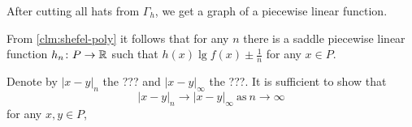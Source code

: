\begin{clm}{}\label{clm:shefel-poly}
After cutting all hats from $\Gamma_h$,
we get a graph of a piecewise linear function.
\end{clm}



From \ref{clm:shefel-poly} it follows that for any $n$
there is a saddle piecewise linear function 
$h_n\colon P\to\mathbb{R}$ such that $h(x)\lg f(x)\pm\tfrac1n$
for any $x\in P$.

Denote by $|x-y|_n$ the ???
and $|x-y|_\infty$ the ???.
It is sufficient to show that
\[|x-y|_n\to|x-y|_\infty\ \text{as}\ n\to\infty\]
for any $x,y\in P$,


\qeds


